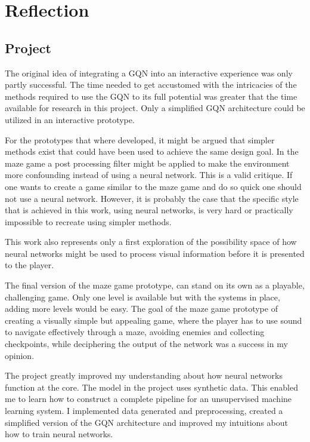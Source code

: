 
\chapter{Reflection}
\section{Project}
The original idea of integrating a GQN into an interactive experience was only partly successful. The time needed to get accustomed with the intricacies of the methods required to use the GQN to its full potential was greater that the time available for research in this project. Only a simplified GQN architecture could be utilized in an interactive prototype.

For the prototypes that where developed, it might be argued that simpler methods exist that could have been used to achieve the same design goal. In the maze game a post processing filter might be applied to make the environment more confounding instead of using a neural network. This is a valid critique. If one wants to create a game similar to the maze game and do so quick one should not use a neural network. However, it is probably the case that the specific style that is achieved in this work, using neural networks, is very hard or practically impossible to recreate using simpler methods.

This work also represents only a first exploration of the possibility space of how neural networks might be used to process visual information before it is presented to the player.

The final version of the maze game prototype, can stand on its own as a playable, challenging game. Only one level is available but with the systems in place, adding more levels would be easy. The goal of the maze game prototype of creating a visually simple but appealing game, where the player has to use sound to navigate effectively through a maze, avoiding enemies and collecting checkpoints, while deciphering the output of the network was a success in my opinion.

The project greatly improved my understanding about how neural networks function at the core. The model in the project uses synthetic data. This enabled me to learn how to construct a complete pipeline for an unsupervised machine learning system. I implemented data generated and preprocessing, created a simplified version of the GQN architecture and improved my intuitions about how to train neural networks.


